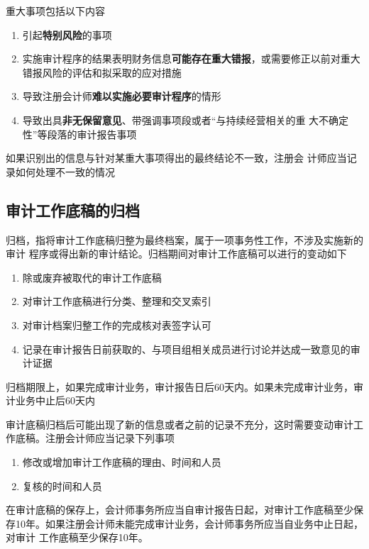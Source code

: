 \documentclass[UTF8,12pt]{ctexart}
\numberwithin{equation}{section} %
\numberwithin{figure}{section}
\numberwithin{table}{section}
\begin{document}
	重大事项包括以下内容
	\begin{enumerate}
		\item 引起\textbf{特别风险}的事项
		
		\item 实施审计程序的结果表明财务信息\textbf{可能存在重大错报}，或需要修正以前对重大错报风险的评估和拟采取的应对措施
		
		\item 导致注册会计师\textbf{难以实施必要审计程序}的情形
		
		\item 导致出具\textbf{非无保留意见}、带强调事项段或者“与持续经营相关的重 大不确定性”等段落的审计报告事项
	\end{enumerate}
	
	如果识别出的信息与针对某重大事项得出的最终结论不一致，注册会 计师应当记录如何处理不一致的情况
	
	\subsection{审计工作底稿的归档}
	归档，指将审计工作底稿归整为最终档案，属于一项事务性工作，不涉及实施新的审计 程序或得出新的审计结论。归档期间对审计工作底稿可以进行的变动如下
	\begin{enumerate}
		\item 除或废弃被取代的审计工作底稿
		
		\item 对审计工作底稿进行分类、整理和交叉索引
		
		\item 对审计档案归整工作的完成核对表签字认可
		
		\item 记录在审计报告日前获取的、与项目组相关成员进行讨论并达成一致意见的审计证据
	\end{enumerate}
	
	归档期限上，如果完成审计业务，审计报告日后60天内。如果未完成审计业务，审计业务中止后60天内
	
	审计底稿归档后可能出现了新的信息或者之前的记录不充分，这时需要变动审计工作底稿。注册会计师应当记录下列事项
	\begin{enumerate}
		\item 修改或增加审计工作底稿的理由、时间和人员
	
		\item 复核的时间和人员
	\end{enumerate}
	
	在审计底稿的保存上，会计师事务所应当自审计报告日起，对审计工作底稿至少保存10年。如果注册会计师未能完成审计业务，会计师事务所应当自业务中止日起，对审计 工作底稿至少保存10年。
	
\end{document}
